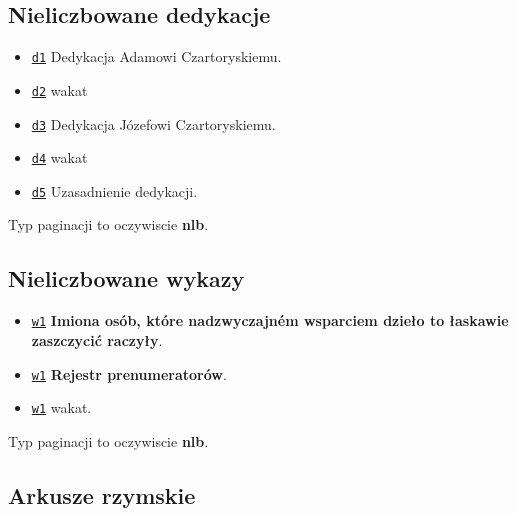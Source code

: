 \documentclass[12]{mwart}
\begin{document}
\subsection{Nieliczbowane dedykacje}
\label{sec:niel-dedyk}

\begin{itemize}
\item \href{\pai{1}{47}}{\texttt{d1}} Dedykacja Adamowi Czartoryskiemu.
\item \href{\pai{1}{48}}{\texttt{d2}} wakat
\item \href{\pai{1}{49}}{\texttt{d3}} Dedykacja Józefowi Czartoryskiemu.
\item \href{\pai{1}{50}}{\texttt{d4}} wakat
\item \href{\pai{1}{51}}{\texttt{d5}} Uzasadnienie dedykacji.
\end{itemize}

Typ paginacji to oczywiscie \textbf{nlb}.

\subsection{Nieliczbowane wykazy}
\label{sec:nieliczbowane-wykazy}




\begin{itemize}
\item \href{\pai{1}{53}}{\texttt{w1}} \textbf{Imiona osób, które nadzwyczajném
  wsparciem dzieło to łaskawie zaszczycić raczyły}.
\item \href{\pai{1}{54}}{\texttt{w1}} \textbf{Rejestr prenumeratorów}.
\item \href{\pai{1}{56}}{\texttt{w1}} wakat.
\end{itemize}

Typ paginacji to oczywiscie \textbf{nlb}.


\subsection{Arkusze rzymskie}
\label{sec:arkusze-rzymskie}
\end{document}

